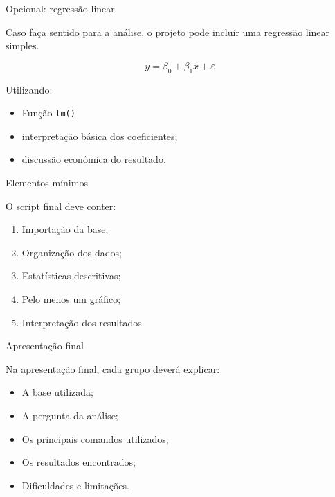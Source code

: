 \documentclass[11pt]{beamer}
\begin{document}
	\begin{frame}{Opcional: regressão linear}
		
		Caso faça sentido para a análise, o projeto pode incluir uma regressão linear simples.
		
		\vspace{0.3cm}
		
		\[
		y = \beta_0 + \beta_1x + \varepsilon
		\]
		
		\vspace{0.3cm}
		
		Utilizando:
		
		\begin{itemize}
			\item Função \texttt{lm()}
			\item interpretação básica dos coeficientes;
			\item discussão econômica do resultado.
		\end{itemize}
		
	\end{frame}
	
	\begin{frame}{Elementos mínimos}
		
		O script final deve conter:
		
		\begin{enumerate}
			\item Importação da base;
			\item Organização dos dados;
			\item Estatísticas descritivas;
			\item Pelo menos um gráfico;
			\item Interpretação dos resultados.
		\end{enumerate}
		
	\end{frame}
	
	\begin{frame}{Apresentação final}
		
		Na apresentação final, cada grupo deverá explicar:
		
		\begin{itemize}
			\item A base utilizada;
			\item A pergunta da análise;
			\item Os principais comandos utilizados;
			\item Os resultados encontrados;
			\item Dificuldades e limitações.
		\end{itemize}
		
	\end{frame}
	
\end{document}
